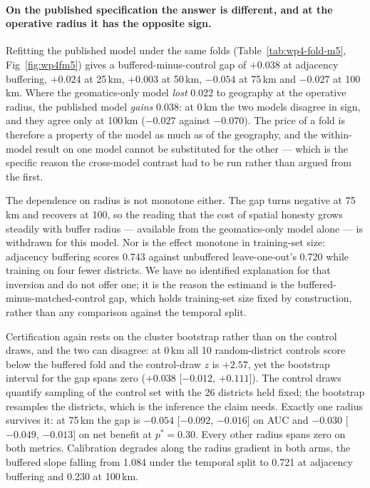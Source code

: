 \paragraph{On the published specification the answer is different, and at the operative radius it has the opposite sign.}\REBUILD{} Refitting the published model under the same folds (Table~\ref{tab:wp4-fold-m5}, Fig~\ref{fig:wp4fm5}) gives a buffered-minus-control gap of $+0.038$ at adjacency buffering, $+0.024$ at 25\,km, $+0.003$ at 50\,km, $-0.054$ at 75\,km and $-0.027$ at 100\,km. Where the geomatics-only model \emph{lost} 0.022 to geography at the operative radius, the published model \emph{gains} 0.038: at 0\,km the two models disagree in sign, and they agree only at 100\,km ($-0.027$ against $-0.070$). The price of a fold is therefore a property of the model as much as of the geography, and the within-model result on one model cannot be substituted for the other --- which is the specific reason the cross-model contrast had to be run rather than argued from the first.

The dependence on radius is not monotone either. The gap turns negative at 75\,km and recovers at 100, so the reading that the cost of spatial honesty grows steadily with buffer radius --- available from the geomatics-only model alone --- is withdrawn for this model. Nor is the effect monotone in training-set size: adjacency buffering scores 0.743 against unbuffered leave-one-out's 0.720 while training on four fewer districts. We have no identified explanation for that inversion and do not offer one; it is the reason the estimand is the buffered-minus-matched-control gap, which holds training-set size fixed by construction, rather than any comparison against the temporal split.

Certification again rests on the cluster bootstrap rather than on the control draws, and the two can disagree: at 0\,km all 10 random-district controls score below the buffered fold and the control-draw $z$ is $+2.57$, yet the bootstrap interval for the gap spans zero ($+0.038$ [$-0.012$, $+0.111$]). The control draws quantify sampling of the control set with the 26 districts held fixed; the bootstrap resamples the districts, which is the inference the claim needs. Exactly one radius survives it: at 75\,km the gap is $-0.054$ [$-0.092$, $-0.016$] on AUC and $-0.030$ [$-0.049$, $-0.013$] on net benefit at $p^*=0.30$. Every other radius spans zero on both metrics. Calibration degrades along the radius gradient in both arms, the buffered slope falling from 1.084 under the temporal split to 0.721 at adjacency buffering and 0.230 at 100\,km.

